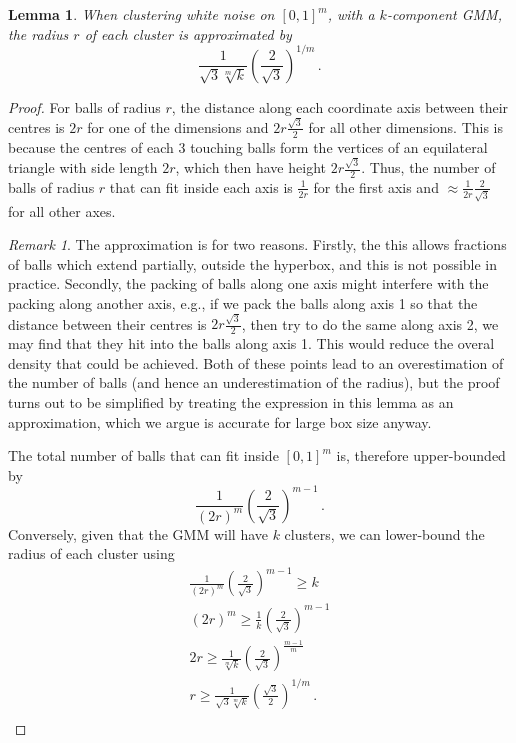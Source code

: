 \documentclass[a4paper,fleqn]{cas-sc}
\newtheorem{lemma}[theorem]{Lemma}
\theoremstyle{remark}
\newtheorem{remark}[theorem]{Remark}
\begin{document}
\begin{lemma} \label{lemma:r}
When clustering white noise on $[0,1]^m$, with a $k$-component GMM, the radius $r$ of each cluster is approximated by
 \begin{equation} \label{eq:r}
\frac{1}{\sqrt{3}\sqrt[m]{k}}\left(\frac{2}{\sqrt{3}}\right)^{1/m} \,.
\end{equation}
\end{lemma}
\begin{proof}
For balls of radius $r$, the distance along each coordinate axis between their centres is $2r$ for one of the dimensions and $2r\frac{\sqrt{3}}{2}$ for all other dimensions. This is because the centres of each 3 touching balls form the vertices of an equilateral triangle with side length $2r$, which then have height $2r\frac{\sqrt{3}}{2}$. Thus, the number of balls of radius $r$ that can fit inside each axis is $\frac{1}{2r}$ for the first axis and $\approx \frac{1}{2r}\frac{2}{\sqrt{3}}$ for all other axes. 
\begin{remark}The approximation is for two reasons. Firstly, the this allows fractions of balls which extend partially, outside the hyperbox, and this is not possible in practice. Secondly, the packing of balls along one axis might interfere with the packing along another axis, e.g., if we pack the balls along axis 1 so that the distance between their centres is $2r\frac{\sqrt{3}}{2}$, then try to do the same along axis 2, we may find that they hit into the balls along axis 1. This would reduce the overal density that could be achieved. Both of these points lead to an overestimation of the number of balls (and hence an underestimation of the radius), but the proof turns out to be simplified by treating the expression in this lemma as an approximation, which we argue is accurate for large box size anyway.
\end{remark}
The total number of balls that can fit inside $[0,1]^m$ is, therefore upper-bounded by
\[
\frac{1}{(2r)^m}\left(\frac{2}{\sqrt{3}}\right)^{m-1}\,.
\]
Conversely, given that the GMM will have $k$ clusters, we can lower-bound the radius of each cluster using 
\begin{gather*}
\frac{1}{(2r)^m}\left(\frac{2}{\sqrt{3}}\right)^{m-1} \geq k \\
(2r)^m \geq \frac{1}{k}\left(\frac{2}{\sqrt{3}}\right)^{m-1}  \\
2r \geq \frac{1}{\sqrt[m]{k}}\left(\frac{2}{\sqrt{3}}\right)^{\frac{m-1}{m}}  \\
r \geq \frac{1}{\sqrt{3}\sqrt[m]{k}}\left(\frac{\sqrt{3}}{2}\right)^{1/m} \,. \\
\end{gather*}
\end{proof}
\end{document}
